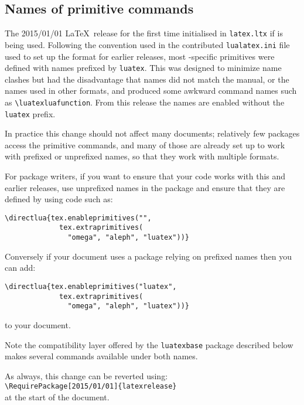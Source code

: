 \documentclass{ltnews}
\providecommand\pkg[1]{\texttt{#1}}
\providecommand\file[1]{\texttt{#1}}
\begin{document}
\subsection{Names of  primitive commands}

The 2015/01/01 \LaTeX\ release for the first time initialised
 in \file{latex.ltx} if  is being
used. Following the convention used in the contributed
\file{lualatex.ini} file used to set up the format for earlier
releases, most -specific primitives were defined with
names prefixed by \texttt{luatex}. This was designed to minimize name
clashes but had the disadvantage that names did not match the
 manual, or the names used in other formats, and
produced some awkward command names such as \verb|\luatexluafunction|.
From this release the names are enabled without the \texttt{luatex}
prefix.

In practice this change should not affect many documents; relatively
few packages access the primitive commands, and many of those are
already set up to work with prefixed or unprefixed names, so that they
work with multiple formats.

For package writers, if you want to ensure that your code works with
this and earlier releases, use unprefixed names in the package and
ensure that they are defined by using code such as:
\begin{verbatim}
\directlua{tex.enableprimitives("",
             tex.extraprimitives(
               "omega", "aleph", "luatex"))}
\end{verbatim}
Conversely if your document  uses a package relying on prefixed names
then you can add:
\begin{verbatim}
\directlua{tex.enableprimitives("luatex",
             tex.extraprimitives(
               "omega", "aleph", "luatex"))}
\end{verbatim}
to your document.

Note the compatibility layer offered by the \pkg{luatexbase} package
described below makes several commands available under both names.

As always, this change can be reverted using:\\
\verb|\RequirePackage[2015/01/01]{latexrelease}|\\
at the start of the document.
\end{document}
